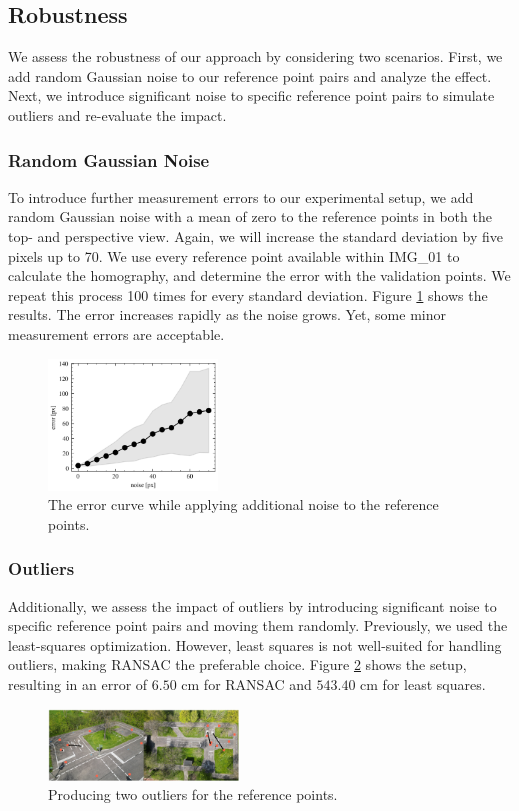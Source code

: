 \subsection{Robustness}
We assess the robustness of our approach by considering two scenarios. 
First, we add random Gaussian noise to our reference point pairs and 
analyze the effect. Next, we introduce significant noise to specific 
reference point pairs to simulate outliers and re-evaluate the impact.

\subsubsection{Random Gaussian Noise}
To introduce further measurement errors to our experimental setup, we  
add random Gaussian noise with a mean of zero to the reference points in 
both the top- and perspective view. Again, we will increase the standard 
deviation by five pixels up to 70. We use every reference point available 
within IMG\_01 to calculate the homography, and determine the error with 
the validation points. We repeat this process 100 times for every 
standard deviation. Figure \ref{fig:random_noise}
shows the results. The error increases rapidly as the noise grows. Yet,
some minor measurement errors are acceptable.

\begin{figure}
	\begin{center}
		\includegraphics[width=0.40\textwidth]{figures/noise_results.png}
	\end{center}
	\caption{The error curve while applying additional noise to the 
	reference points.}
	\label{fig:random_noise}
\end{figure}

\subsubsection{Outliers} 
Additionally, we assess the impact of outliers by introducing significant 
noise to specific reference point pairs and moving them randomly. Previously, 
we used the least-squares optimization. 
However, least squares is not well-suited for handling outliers, making 
RANSAC the preferable choice. Figure \ref{fig:outliers} shows the setup, 
resulting in an error of $6.50$ cm for RANSAC and $543.40$ cm for 
least squares.

\begin{figure}
	\begin{center}
		\includegraphics[width=0.45\textwidth]{figures/setup_outlier.png}
	\end{center}
	\caption{Producing two outliers for the reference points.}\label{fig:outliers}
\end{figure}
